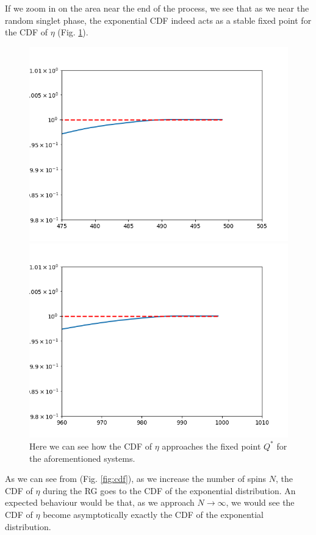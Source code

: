 \documentclass[../numerical,../../main.tex]{subfiles}
\begin{document}
If we zoom in on the area near the end of the process, we see that as we near the random singlet phase, the exponential CDF indeed acts as a stable fixed point for the CDF of $\eta$ (Fig. \ref{fig:fixed}).
\begin{figure}[H]
\centering
    \begin{minipage}[]{.49\textwidth}
    \includegraphics[scale=0.4]{Chapter5/Figures/Distribution/near_singlet1k.png}
    \end{minipage}
    \begin{minipage}[]{.49\textwidth}
    \includegraphics[scale=0.4]{Chapter5/Figures/Distribution/near_singlet2k.png}
    \end{minipage}
    \caption{Here we can see how the CDF of $\eta$ approaches the fixed point $Q^{*}$ for the aforementioned systems.}
    \label{fig:fixed}
\end{figure}
As we can see from (Fig. \ref{fig:cdf}), as we increase the number of spins $N$, the CDF of $\eta$ during the RG goes to the CDF of the exponential distribution. An expected behaviour would be that, as we approach $N\to\infty$, we would see the CDF of $\eta$ become asymptotically exactly the CDF of the exponential distribution.\\
\end{document}
